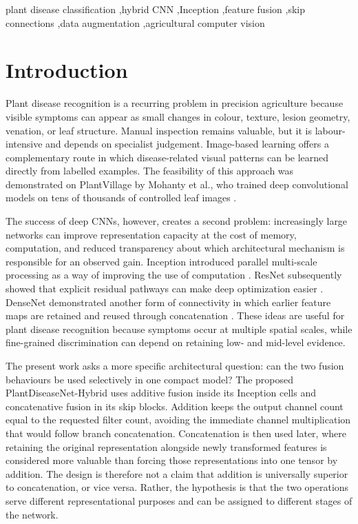 \documentclass[a4paper,fleqn]{cas-dc}
\begin{document}
\begin{keywords}
plant disease classification \sep hybrid CNN \sep Inception \sep feature fusion \sep skip connections \sep data augmentation \sep agricultural computer vision
\end{keywords}
\maketitle

\section{Introduction}
Plant disease recognition is a recurring problem in precision agriculture because visible symptoms can appear as small changes in colour, texture, lesion geometry, venation, or leaf structure. Manual inspection remains valuable, but it is labour-intensive and depends on specialist judgement. Image-based learning offers a complementary route in which disease-related visual patterns can be learned directly from labelled examples. The feasibility of this approach was demonstrated on PlantVillage by Mohanty et al., who trained deep convolutional models on tens of thousands of controlled leaf images \cite{mohanty2016}.

The success of deep CNNs, however, creates a second problem: increasingly large networks can improve representation capacity at the cost of memory, computation, and reduced transparency about which architectural mechanism is responsible for an observed gain. Inception introduced parallel multi-scale processing as a way of improving the use of computation \cite{szegedy2015}. ResNet subsequently showed that explicit residual pathways can make deep optimization easier \cite{he2016}. DenseNet demonstrated another form of connectivity in which earlier feature maps are retained and reused through concatenation \cite{huang2017}. These ideas are useful for plant disease recognition because symptoms occur at multiple spatial scales, while fine-grained discrimination can depend on retaining low- and mid-level evidence.

The present work asks a more specific architectural question: can the two fusion behaviours be used selectively in one compact model? The proposed PlantDiseaseNet-Hybrid uses additive fusion inside its Inception cells and concatenative fusion in its skip blocks. Addition keeps the output channel count equal to the requested filter count, avoiding the immediate channel multiplication that would follow branch concatenation. Concatenation is then used later, where retaining the original representation alongside newly transformed features is considered more valuable than forcing those representations into one tensor by addition. The design is therefore not a claim that addition is universally superior to concatenation, or vice versa. Rather, the hypothesis is that the two operations serve different representational purposes and can be assigned to different stages of the network.
\end{document}
